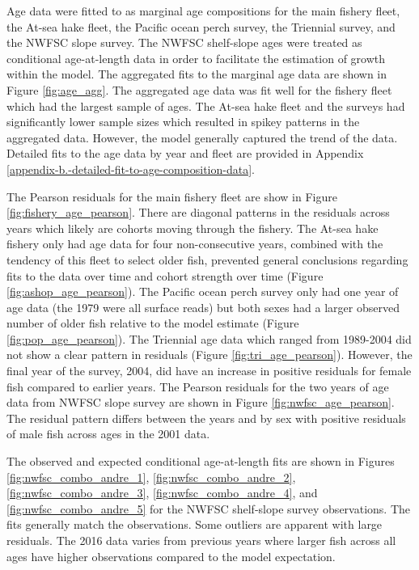 \documentclass[12pt,]{article}
\begin{document}
Age data were fitted to as marginal age compositions for the main
fishery fleet, the At-sea hake fleet, the Pacific ocean perch survey,
the Triennial survey, and the NWFSC slope survey. The NWFSC shelf-slope
ages were treated as conditional age-at-length data in order to
facilitate the estimation of growth within the model. The aggregated
fits to the marginal age data are shown in Figure \ref{fig:age_agg}. The
aggregated age data was fit well for the fishery fleet which had the
largest sample of ages. The At-sea hake fleet and the surveys had
significantly lower sample sizes which resulted in spikey patterns in
the aggregated data. However, the model generally captured the trend of
the data. Detailed fits to the age data by year and fleet are provided
in Appendix \ref{appendix-b.-detailed-fit-to-age-composition-data}.

The Pearson residuals for the main fishery fleet are show in Figure
\ref{fig:fishery_age_pearson}. There are diagonal patterns in the
residuals across years which likely are cohorts moving through the
fishery. The At-sea hake fishery only had age data for four
non-consecutive years, combined with the tendency of this fleet to
select older fish, prevented general conclusions regarding fits to the
data over time and cohort strength over time (Figure
\ref{fig:ashop_age_pearson}). The Pacific ocean perch survey only had
one year of age data (the 1979 were all surface reads) but both sexes
had a larger observed number of older fish relative to the model
estimate (Figure \ref{fig:pop_age_pearson}). The Triennial age data
which ranged from 1989-2004 did not show a clear pattern in residuals
(Figure \ref{fig:tri_age_pearson}). However, the final year of the
survey, 2004, did have an increase in positive residuals for female fish
compared to earlier years. The Pearson residuals for the two years of
age data from NWFSC slope survey are shown in Figure
\ref{fig:nwfsc_age_pearson}. The residual pattern differs between the
years and by sex with positive residuals of male fish across ages in the
2001 data.

The observed and expected conditional age-at-length fits are shown in
Figures \ref{fig:nwfsc_combo_andre_1}, \ref{fig:nwfsc_combo_andre_2},
\ref{fig:nwfsc_combo_andre_3}, \ref{fig:nwfsc_combo_andre_4}, and
\ref{fig:nwfsc_combo_andre_5} for the NWFSC shelf-slope survey
observations. The fits generally match the observations. Some outliers
are apparent with large residuals. The 2016 data varies from previous
years where larger fish across all ages have higher observations
compared to the model expectation.
\end{document}
